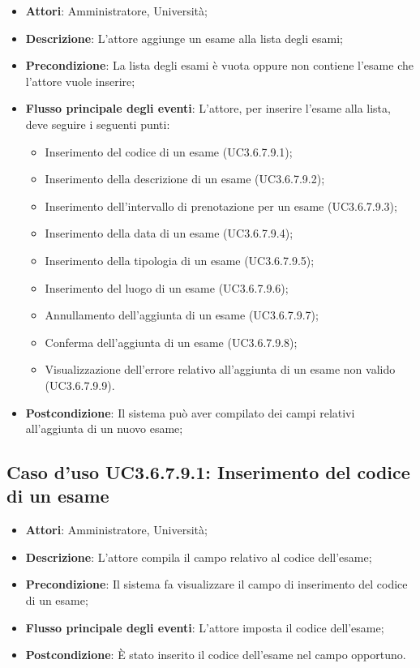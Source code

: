 \begin{itemize}
	\item \textbf{Attori}: Amministratore, Università;
	\item \textbf{Descrizione}: L'attore aggiunge un esame alla lista degli esami;
	
	\item \textbf{Precondizione}: La lista degli esami è vuota oppure non contiene l'esame che l'attore vuole inserire;
	
	\item \textbf{Flusso principale degli eventi}: L'attore, per inserire l'esame alla lista, deve seguire i seguenti punti:
	
	\begin{itemize}
		\item Inserimento del codice di un esame (UC3.6.7.9.1);
		\item Inserimento della descrizione di un esame (UC3.6.7.9.2);
		\item Inserimento dell’intervallo di prenotazione per un esame (UC3.6.7.9.3);
		\item Inserimento della data di un esame (UC3.6.7.9.4);
		\item Inserimento della tipologia di un esame (UC3.6.7.9.5);
		\item Inserimento del luogo di un esame (UC3.6.7.9.6);
		\item Annullamento dell’aggiunta di un esame (UC3.6.7.9.7);
		\item Conferma dell’aggiunta di un esame (UC3.6.7.9.8);
		\item Visualizzazione dell'errore relativo all’aggiunta di un esame non valido (UC3.6.7.9.9).
	\end{itemize}
	\item \textbf{Postcondizione}: Il sistema può aver compilato dei campi relativi all'aggiunta di un nuovo esame;
	
\end{itemize}
\subsection{Caso d'uso \texorpdfstring{UC3.6.7.9.1}{UC3.6.7.9.1}: Inserimento del codice di un esame}
\begin{itemize}
	\item \textbf{Attori}: Amministratore, Università;
	\item \textbf{Descrizione}: L'attore compila il campo relativo al codice dell’esame;
	
	\item \textbf{Precondizione}: Il sistema fa visualizzare il campo di inserimento del codice di un esame;
	\item \textbf{Flusso principale degli eventi}: L'attore imposta il codice dell’esame;
	
	\item \textbf{Postcondizione}: È stato inserito il codice dell'esame nel campo opportuno.
\end{itemize}

